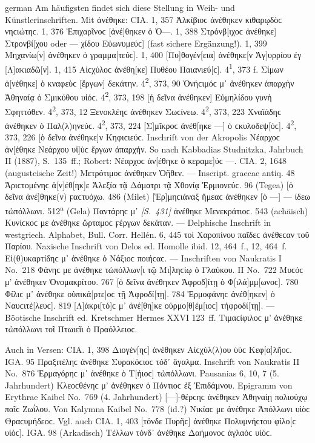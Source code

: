\begin{otherlanguage*}{german}
Am häufigsten findet sich diese Stellung in Weih- und Künstlerinschriften. Mit ἀνέθηκε: CIA. 1, 357 Ἀλκίβιοϲ ἀνέθηκεν κιθαρῳδὸϲ νηϲιώτηϲ. 1, 376 Ἐπιχαρῖνοϲ [ἀνέ]θηκεν ὁ Ὀ—. 1, 388 Στρόνβ[ιχοϲ ἀνέθηκε] Στρονβί[χου oder — χίδου Εὐ\-ω\-νυ\-μεύϲ] (fast sichere Ergänzung!). 1, 399 Μηχανίω[ν] ἀνέθηκεν ὁ γραμμα[τεύϲ]. 1, 400 [Πυ]θογέν[εια] ἀνέθηκε[ν Ἀγ]υρρίου ἐγ [Λ]ακιαδῶ[ν]. 1, 415 Αἰϲχύλοϲ ἀνέθη[κε] Πυθέου Παιανιεύ[ϲ]. 4\textsuperscript{1}, 373 f. Σίμων ἀ[νέθηκε] ὁ κναφεὺϲ [ἔργων] δεκάτην. 4\textsuperscript{2}, 373, 90 Ὀνήϲιμόϲ μ᾽ ἀνέθηκεν ἀπαρχὴν Ἀθηναίᾳ ὁ Σμικύθου υἱόϲ. 4\textsuperscript{2}, 373, 198 [ἡ δεῖνα ἀνέθηκεν] Εὐμηλίδου γυνὴ Σφηττόθεν. 4\textsuperscript{2}, 373, 12 Ξενοκλέηϲ ἀνέθηκεν Σωϲίνεω. 4\textsuperscript{2}, 373, 223 Χναϊάδηϲ ἀνέθηκεν ὁ Παλ(λ)ηνεύϲ. 4\textsuperscript{2}, 373, 224 [Σ]μῖκροϲ ἀνέθ[ηκε —] ὁ ϲκυλοδεψ[όϲ]. 4\textsuperscript{2}, 373, 226 [ὁ δεῖνα ἀνέθηκε]ν Κηφιϲιεύϲ. Inschrift von der Akropolis Νέαρχοϲ ἀν[έθηκε Νεάρχου υἱ]ὺϲ ἔργων ἀπαρχήν. So nach Kabbadias Studnitzka, Jahrbuch II (1887), S.~135~ff.; Robert: Νέαρχοϲ ἀν[έθηκε ὁ κεραμε]ύϲ —. CIA. 2, 1648 (augusteische Zeit!) Μετρότιμοϲ ἀνέθηκεν Ὀῆθεν. — Inscript. graecae antiq. 48 Ἀριϲτομένηϲ ἀ[ν]έθ[ηκ]ε Ἀλεξία τᾷ Δάματρι τᾷ Χθονίᾳ Ἑρμιονεύϲ. 96 (Tegea) [ὁ δεῖνα ἀνέ]θηκε(ν) ϝαϲτυόχω. 486 (Milet) [Ἑρ]μηϲιάναξ ἥμεαϲ ἀνέθηκεν [ὁ —] — ίδεω τὠπόλλωνι. 512\textsuperscript{a} (Gela) Παντάρηϲ μ᾽ \hypertarget{p431}{\emph{[S.~431]}}\label{p431} ἀνέθηκε Μενεκράτιοϲ. 543 (achäisch) Κυνίϲκοϲ με ἀνέθηκε ὥρταμοϲ ϝέργων δεκάταν. — Delphische Inschrift in westgriech. Alphabet, Bull. Corr. Hellén. 6, 445 τοὶ Χαροπίνου παῖδεϲ ἀνέθεϲαν τοῦ Παρίου. Naxische Inschrift von Delos ed. Homolle ibid. 12, 464~f., 12, 464~f. Εἰ(θ)υκαρτίδηϲ μ᾽ ἀνέθηκε ὁ Νάξιοϲ ποιήϲαϲ. — Inschriften von Naukratis I No.~218 Φάνηϲ με ἀνέθηκε τὠπόλλων[ι τῷ Μι]ληϲίῳ ὁ Γλαύκου. II No.~722 Μυϲόϲ μ’ ἀνέθηκεν Ὀνομακρίτου. 767 [ὁ δεῖνα ἀνέθηκεν Ἀφροδ]ίτῃ ὁ Φ[ιλά]μμ[ωνοϲ]. 780 Φίλιϲ μ᾽ ἀνέθηκε οὑπικά[ρτε]οϲ τῇ Ἀφροδί[τῃ]. 784 Ἑρμοφάνηϲ ἀνέθ[ηκεν] ὁ Ναυ\-ϲι\-τέ[\-λευϲ]. 819 [Λ]άκρι[τό]ϲ μ᾽ ἀνέ[θη]κε οὑρμο[θ]έμ[ιοϲ] τἠφροδί[τῃ]. — Böotische Inschrift ed. Kretschmer Hermes XXVI 123~ff. Τιμαϲίφιλοϲ μ’ ἀνέθηκε τὠπόλλωνι τοῖ Πτωιεῖι ὁ Πραόλλειοϲ.

Auch in Versen: CIA. 1, 398 Διογέν[ηϲ] ἀνέθηκεν Αἰϲχύλ(λ)ου ὑὺϲ Κεφ[α]λῆοϲ. IGA. 95 Πραξιτέληϲ ἀνέθηκε Συρακόϲιοϲ τόδ᾽ ἄγαλμα. Inschrift von Naukratis II No.~876 Ἑρμαγόρηϲ μ᾽ ἀνέθηκε ὁ Τ[ήιοϲ] τὠπόλλωνι. Pausanias 6, 10, 7 (5. Jahrhundert) Κλεοϲθένηϲ μ’ ἀνέθηκεν ὁ Πόντιοϲ ἐξ Ἐπιδάμνου. Epigramm von Erythrae Kaibel No.~769 (4. Jahrhundert) [—]-θέρϲηϲ ἀνέθηκεν Ἀθηναίῃ πολιούχῳ παῖϲ Ζωΐλου. Von Kalymna Kaibel No.~778 (id.?) Νικίαϲ με ἀνέθηκε Ἀπόλλωνι υἱὸϲ Θραϲυμήδεοϲ. Vgl. auch CIA. 1, 403 [τόνδε Πυρῆϲ] ἀνέθηκε Πολυμνήϲτου φίλο[ϲ υἱόϲ]. IGA. 98 (Arkadisch) Τέλλων τόνδ᾽ ἀνέθηκε Δαήμονοϲ ἀγλαὸϲ υἱόϲ.


\end{otherlanguage*}
